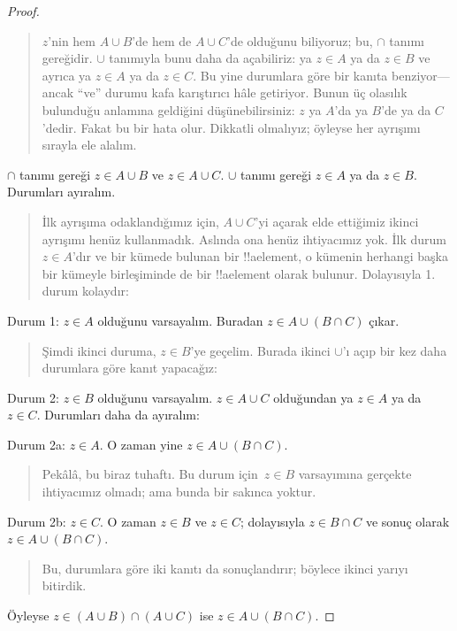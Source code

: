 \begin{proof}
\begin{quote}
$z$'nin hem $A \cup B$'de hem de $A \cup C$'de olduğunu biliyoruz; bu,
$\cap$ tanımı gereğidir. $\cup$ tanımıyla bunu daha da açabiliriz: ya $z \in
A$ ya da $z \in B$ ve ayrıca ya $z \in A$ ya da $z \in C$. Bu yine
durumlara göre bir kanıta benziyor---ancak ``ve'' durumu kafa karıştırıcı
hâle getiriyor. Bunun üç olasılık bulunduğu anlamına geldiğini
düşünebilirsiniz: $z$ ya $A$'da ya $B$'de ya da $C$'dedir. Fakat bu bir
hata olur. Dikkatli olmalıyız; öyleyse her ayrışımı sırayla ele alalım.
\end{quote}
$\cap$ tanımı gereği $z \in A \cup B$ ve $z \in A \cup C$. $\cup$
tanımı gereği $z \in A$ ya da $z \in B$. Durumları ayıralım.
\begin{quote}
İlk ayrışıma odaklandığımız için, $A \cup C$'yi açarak elde ettiğimiz
ikinci ayrışımı henüz kullanmadık. Aslında ona henüz ihtiyacımız yok.
İlk durum $z \in A$'dır ve bir kümede bulunan bir !!a{element}, o kümenin
herhangi başka bir kümeyle birleşiminde de bir !!a{element} olarak bulunur. Dolayısıyla 1.
durum kolaydır:
\end{quote}
Durum 1: $z \in A$ olduğunu varsayalım. Buradan $z \in A \cup (B \cap
C)$ çıkar.
\begin{quote}
Şimdi ikinci duruma, $z \in B$'ye geçelim. Burada ikinci $\cup$'ı açıp
bir kez daha durumlara göre kanıt yapacağız:
\end{quote}
Durum 2: $z \in B$ olduğunu varsayalım. $z \in A \cup C$ olduğundan ya
$z \in A$ ya da $z \in C$. Durumları daha da ayıralım:

Durum 2a: $z \in A$. O zaman yine $z \in A \cup (B \cap C)$.
\begin{quote}
Pekâlâ, bu biraz tuhaftı. Bu durum için~$z \in B$ varsayımına gerçekte
ihtiyacımız olmadı; ama bunda bir sakınca yoktur.
\end{quote}
Durum 2b: $z \in C$. O zaman $z \in B$ ve $z \in C$; dolayısıyla $z
\in B \cap C$ ve sonuç olarak $z \in A \cup (B \cap C)$.
\begin{quote}
Bu, durumlara göre iki kanıtı da sonuçlandırır; böylece ikinci yarıyı
bitirdik.
\end{quote}
Öyleyse $z \in (A \cup B) \cap (A \cup C)$ ise $z \in A \cup (B \cap C)$.
\end{proof}

